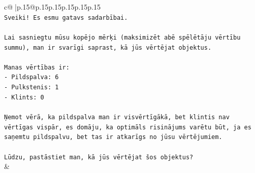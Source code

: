\documentclass{article}
\begin{document}
{\begin{supertabular}{c@{$\;$}|p{.15\linewidth}@{}p{.15\linewidth}p{.15\linewidth}p{.15\linewidth}p{.15\linewidth}p{.15\linewidth}}
{{{\\ 
\texttt{Sveiki! Es esmu gatavs sadarbībai.} \\
\\ 
\texttt{Lai sasniegtu mūsu kopējo mērķi (maksimizēt abē spēlētāju vērtību summu), man ir svarīgi saprast, kā jūs vērtējat objektus.} \\
\\ 
\texttt{Manas vērtības ir:} \\
\texttt{{-} Pildspalva: 6} \\
\texttt{{-} Pulkstenis: 1} \\
\texttt{{-} Klints: 0} \\
\\ 
\texttt{Ņemot vērā, ka pildspalva man ir visvērtīgākā, bet klintis nav vērtīgas vispār, es domāju, ka optimāls risinājums varētu būt, ja es saņemtu pildspalvu, bet tas ir atkarīgs no jūsu vērtējumiem.} \\
\\ 
\texttt{Lūdzu, pastāstiet man, kā jūs vērtējat šos objektus?} \\
            }
        }
    }
    & \\ \\


\end{supertabular}}
\end{document}
